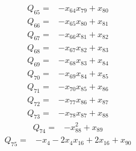 \begin{equation*}\begin{split}
Q_{65}={}&-x_{64} x_{79} + x_{80}
\end{split}\end{equation*}
\begin{equation*}\begin{split}
Q_{66}={}&-x_{65} x_{80} + x_{81}
\end{split}\end{equation*}
\begin{equation*}\begin{split}
Q_{67}={}&-x_{66} x_{81} + x_{82}
\end{split}\end{equation*}
\begin{equation*}\begin{split}
Q_{68}={}&-x_{67} x_{82} + x_{83}
\end{split}\end{equation*}
\begin{equation*}\begin{split}
Q_{69}={}&-x_{68} x_{83} + x_{84}
\end{split}\end{equation*}
\begin{equation*}\begin{split}
Q_{70}={}&-x_{69} x_{84} + x_{85}
\end{split}\end{equation*}
\begin{equation*}\begin{split}
Q_{71}={}&-x_{70} x_{85} + x_{86}
\end{split}\end{equation*}
\begin{equation*}\begin{split}
Q_{72}={}&-x_{77} x_{86} + x_{87}
\end{split}\end{equation*}
\begin{equation*}\begin{split}
Q_{73}={}&-x_{78} x_{87} + x_{88}
\end{split}\end{equation*}
\begin{equation*}\begin{split}
Q_{74}={}&-x_{88}^{2} + x_{89}
\end{split}\end{equation*}
\begin{equation*}\begin{split}
Q_{75}={}&-x_{4} - 2x_{4} x_{16} + 2x_{16} + x_{90}
\end{split}\end{equation*}
